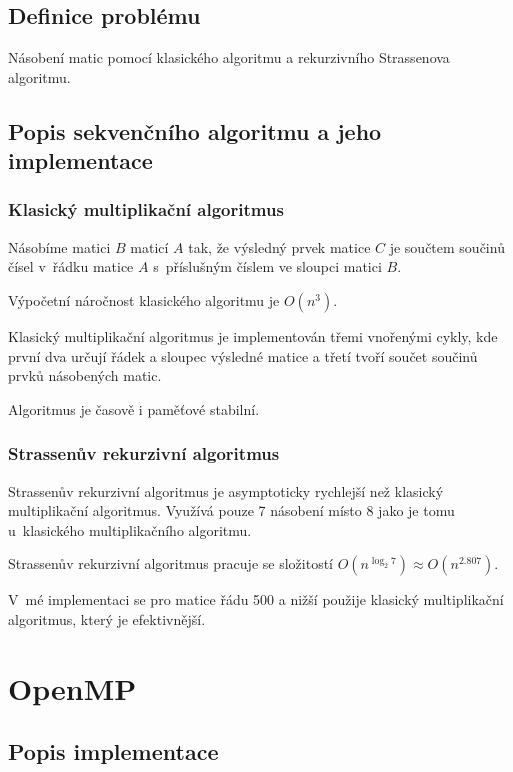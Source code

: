 \documentclass[12pt,a4paper]{article}
\begin{document}
\subsection{Definice problému}

Násobení matic pomocí klasického algoritmu a rekurzivního Strassenova algoritmu.

\subsection{Popis sekvenčního algoritmu a jeho implementace}

\subsubsection{Klasický multiplikační algoritmus}
Násobíme matici $B$ maticí $A$ tak, že výsledný prvek matice $C$ je součtem součinů čísel v~řádku matice $A$ s~příslušným číslem ve sloupci matici $B$.

\bigskip
Výpočetní náročnost klasického algoritmu je $O(n^3)$.

\bigskip
Klasický multiplikační algoritmus je implementován třemi vnořenými cykly, kde první dva určují řádek a sloupec výsledné matice a třetí tvoří součet součinů prvků násobených matic.

\bigskip
Algoritmus je časově i paměťové stabilní.

\subsubsection{Strassenův rekurzivní algoritmus}

Strassenův rekurzivní algoritmus je asymptoticky rychlejší než klasický multiplikační algoritmus. Využívá pouze 7 násobení místo 8 jako je tomu u~klasického multiplikačního algoritmu.

\bigskip
Strassenův rekurzivní algoritmus pracuje se složitostí $O(n^{\log_2{7}}) \approx O(n^{2.807})$. 

\bigskip
V~mé implementaci se pro matice řádu 500 a nižší použije klasický multiplikační algoritmus, který je efektivnější.


\section{OpenMP}
\subsection{Popis implementace}
\end{document}
